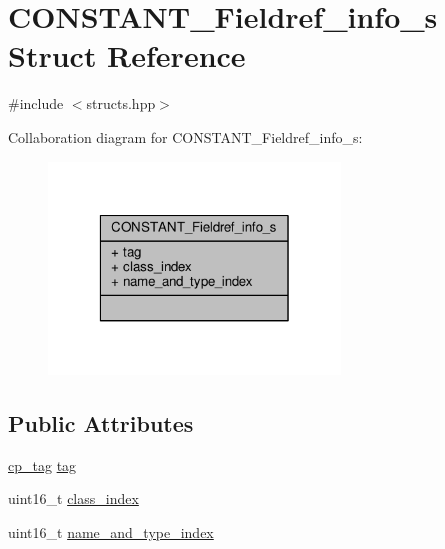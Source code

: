 \hypertarget{structCONSTANT__Fieldref__info__s}{\section{C\+O\+N\+S\+T\+A\+N\+T\+\_\+\+Fieldref\+\_\+info\+\_\+s Struct Reference}
\label{structCONSTANT__Fieldref__info__s}
}


{\ttfamily \#include $<$structs.\+hpp$>$}



Collaboration diagram for C\+O\+N\+S\+T\+A\+N\+T\+\_\+\+Fieldref\+\_\+info\+\_\+s\+:\nopagebreak
\begin{figure}[H]
\begin{center}
\leavevmode
\includegraphics[width=220pt]{structCONSTANT__Fieldref__info__s__coll__graph}
\end{center}
\end{figure}
\subsection*{Public Attributes}
\begin{DoxyCompactItemize}
\item 
\hyperlink{structs_8hpp_a17947ec3f3c1f2392eabd36c1ba5fec6}{cp\+\_\+tag} \hyperlink{structCONSTANT__Fieldref__info__s_a87c470bc8260141489d7bde228887b2a}{tag}
\item 
uint16\+\_\+t \hyperlink{structCONSTANT__Fieldref__info__s_a43b294af041ee1cdb3bc276d0d51ffb9}{class\+\_\+index}
\item 
uint16\+\_\+t \hyperlink{structCONSTANT__Fieldref__info__s_a4577ca33395c8758c345b6e0a0fbc99b}{name\+\_\+and\+\_\+type\+\_\+index}
\end{DoxyCompactItemize}



